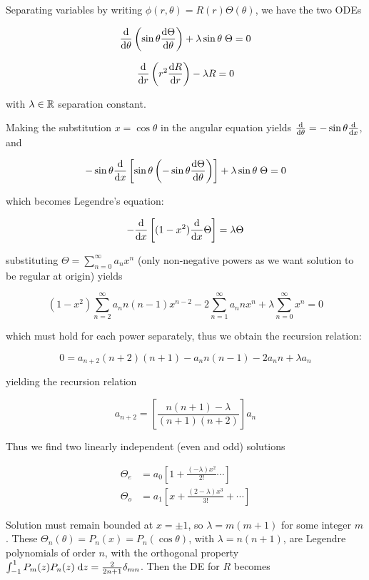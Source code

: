 \documentclass[a4paper]{article}
\begin{document}
Separating variables by writing $ \phi(r,\theta) = R(r) \Theta(\theta) $, we have the two ODEs


\[ \frac{\mathrm{d} }{\mathrm{d} \theta} \left(  \sin \theta \frac{\mathrm{d} \Theta}{\mathrm{d} \theta} \right) + \lambda \sin \theta \; \Theta = 0  \]

\[ \frac{\mathrm{d} }{\mathrm{d} r} \left(  r^{2} \frac{\mathrm{d} R}{\mathrm{d} r} \right) - \lambda R = 0   \]

with $ \lambda \in \mathbb{R} $ separation constant. 

Making the substitution $ x = \cos \theta $ in the angular equation yields $ \frac{\mathrm{d} }{\mathrm{d} \theta} = - \sin \theta \frac{\mathrm{d} }{\mathrm{d} x} $, and 

\[ - \sin \theta \frac{\mathrm{d} }{\mathrm{d} x} \left[  \sin \theta \left(  - \sin \theta \frac{\mathrm{d} \Theta}{\mathrm{d} \theta} \right)  \right] + \lambda \sin \theta \; \Theta = 0  \]

which becomes Legendre's equation: 

\[ - \frac{\mathrm{d} }{\mathrm{d} x}  \left[   (1-x^{2}) \frac{\mathrm{d} }{\mathrm{d} x}  \Theta \right]   = \lambda \Theta \]

substituting  $ \Theta = \sum_{n=0}^{\infty} a_{n} x^{n}  $ (only non-negative powers as we want solution to be regular at origin) yields

\[ (1-x^{2}) \sum_{n=2}^{\infty} a_{n} n(n-1)x^{n-2} - 2 \sum_{n=1}^{\infty} a_{n} n x^{n} + \lambda \sum_{n=0}^{\infty} x^{n} = 0  \]

which must hold for each power separately, thus we obtain the recursion relation:

\[ 0 = a_{n+2}(n+2)(n+1) - a_{n} n(n-1) - 2a_{n} n + \lambda a_{n}  \]

yielding the recursion relation

\[ a_{n+2} = \left[  \frac{n(n+1) - \lambda}{(n+1)(n+2)} \right] a_{n}  \]

Thus we find two linearly independent (even and odd) solutions

\begin{align*}
\Theta_{e} & = a_{0}  \left[  1 + \frac{(-\lambda)x^{2}}{2!} \cdots  \right]   \\
\Theta_{o} & = a_{1} \left[   x + \frac{(2 - \lambda) x^{3} }{3!} + \cdots \right]  
\end{align*}

Solution must remain bounded at $ x = \pm 1 $, so $ \lambda = m(m+1) $ for some integer $ m $. These  $ \Theta_{n}(\theta) = P_{n}(x) = P_{n} (\cos \theta )  $, with $ \lambda= n(n+1) $, are Legendre polynomials of order $ n $, with the orthogonal property $ \int_{-1}^{1} P_{m}(z)P_{n}(z) \; \mathrm{d} z = \frac{2}{2n + 1} \delta_{mn} $. Then the DE for $ R $ becomes
\end{document}
